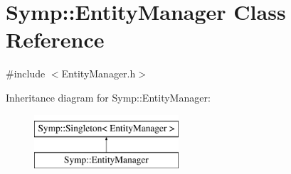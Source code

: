 \hypertarget{class_symp_1_1_entity_manager}{\section{Symp\-:\-:Entity\-Manager Class Reference}
\label{class_symp_1_1_entity_manager}
}


{\ttfamily \#include $<$Entity\-Manager.\-h$>$}

Inheritance diagram for Symp\-:\-:Entity\-Manager\-:\begin{figure}[H]
\begin{center}
\leavevmode
\includegraphics[height=2.000000cm]{class_symp_1_1_entity_manager}
\end{center}
\end{figure}
